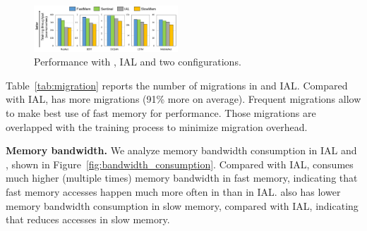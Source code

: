 \begin{figure}
    \centering
    \includegraphics[width=0.48\textwidth]{figures/sentinel_performance.pdf}
\vspace{-20pt}    
\caption{
\textcolor{check}{
Performance with \name, IAL and two configurations. %
}
\vspace{-5pt}
\label{fig:general_perf}}
\end{figure}

Table~\ref{tab:migration} reports the number of migrations in \name and IAL. Compared with IAL, \name has more migrations \textcolor{check}{(91\% more on average)}. Frequent migrations allow \name to make best use of fast memory for performance. \textcolor{check}{Those migrations are  overlapped with the training process to minimize migration overhead.}


\textcolor{check}{\textbf{Memory bandwidth.} 
We analyze memory bandwidth consumption in IAL and \name, shown in Figure~\ref{fig:bandwidth_consumption}. 
Compared with IAL, \name consumes much higher (multiple times) memory bandwidth in fast memory, indicating that fast memory accesses happen much more often in \name than in IAL. \name also has lower memory bandwidth consumption in slow memory, compared with IAL, indicating that \name reduces accesses in slow memory.} %


